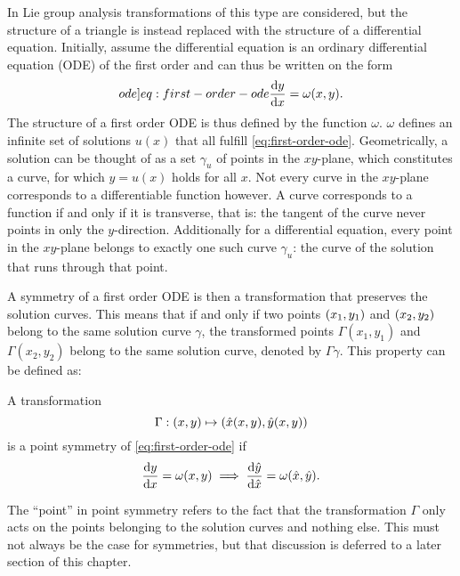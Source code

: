 In Lie group analysis transformations of this type are considered, but the structure of a triangle is instead replaced with the structure of a differential equation.
Initially, assume the differential equation is an ordinary differential equation (ODE) of the first order and can thus be written on the form
\begin{equation} \label[ode]{eq:first-order-ode}
  \dv{y}{x} = \omega(x,y).
\end{equation}
The structure of a first order ODE is thus defined by the function \(\omega\).
\(\omega\) defines an infinite set of solutions \(u(x)\) that all fulfill \cref{eq:first-order-ode}.
Geometrically, a solution can be thought of as a set \(\gamma_u\) of points in the \(xy\)-plane, which constitutes a curve, for which \(y = u(x)\) holds for all \(x\).
Not every curve in the \(xy\)-plane corresponds to a differentiable function however.
A curve corresponds to a function if and only if it is transverse, that is: the tangent of the curve never points in only the \(y\)-direction.
Additionally for a differential equation, every point in the \(xy\)-plane belongs to exactly one such curve \(\gamma_u\): the curve of the solution that runs through that point.

A symmetry of a first order ODE  is then a transformation that preserves the solution curves.
This means that if and only if two points \(\pqty{x_1,y_1}\) and \(\pqty{x_2,y_2}\) belong to the same solution curve \(\gamma\), the transformed points \(\Gamma(x_1,y_1)\) and \(\Gamma(x_2,y_2)\) belong to the same solution curve, denoted by \(\Gamma\gamma\).
This property can be defined as:
\begin{defn} \label{defn:first-order-symmetry}
  A transformation 
  \begin{equation}
    \Gamma: \pqty{x,y} \mapsto \pqty{\hat{x}(x,y), \hat{y}(x,y)}
  \end{equation}
  is a point symmetry of \cref{eq:first-order-ode} if
  \begin{equation}
    \dv{y}{x} = \omega(x,y)
    \implies
    \dv{\hat{y}}{\hat{x}} = \omega(\hat{x},\hat{y}).
  \end{equation}
\end{defn}
The \enquote{point} in point symmetry refers to the fact that the transformation \(\Gamma\) only acts on the points belonging to the solution curves and nothing else.
This must not always be the case for symmetries, but that discussion is deferred to a later section of this chapter. %

